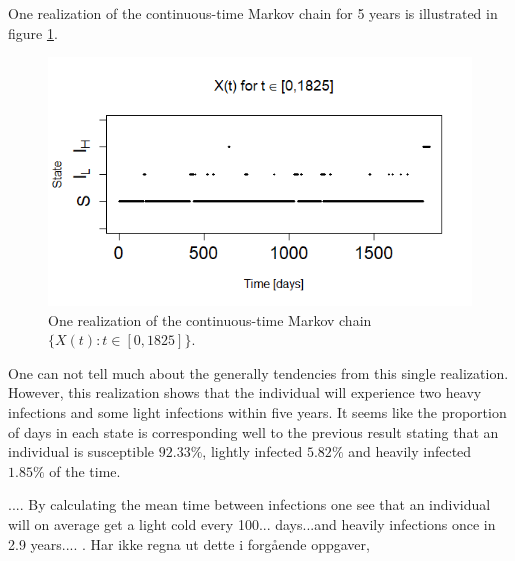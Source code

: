 One realization of the continuous-time Markov chain for 5 years is illustrated in figure \ref{1realiz5yr}.
\begin{figure}
    \centering
    \includegraphics[width=130mm]{1real5yr.png}
    \caption{One realization of the continuous-time Markov chain $\{X(t):t \in [0, 1825]\}$.}
    \label{1realiz5yr}
\end{figure}
One can not tell much about the generally tendencies from this single realization. However, this realization shows that the individual will experience two heavy infections and some light infections within five years. It seems like the proportion of days in each state is corresponding well to the previous result stating that an individual is susceptible $92.33\%$, lightly infected $5.82\%$ and heavily infected $1.85\%$ of the time. 

.... By calculating the mean time between infections one see that an individual will on average get a light cold every 100... days...and heavily infections once in 2.9 years.... . Har ikke regna ut dette i forgående oppgaver, 

